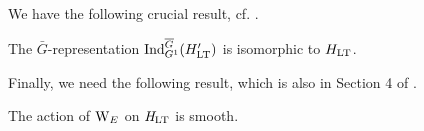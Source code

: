\documentclass[../main.tex]{subfiles}
\begin{document}
We have the following crucial result, cf. \cite[Section 4]{mieda2016geometric}.
\begin{prop}\label{lem:InductionStatementOnHLT}
  The $\bar G$-representation $\operatorname{Ind}_{G^1}^{\overline G} (H'_{\mathrm{LT}})$ is isomorphic to $H_{\mathrm{LT}}$. 
\end{prop}

Finally, we need the following result, which is also in Section 4 of
\cite{mieda2016geometric}.
\begin{lem}\label{lem:GActsSmoothlyOnHLT}
  The action of $\mathrm W_E$ on $\mathit H_{\mathrm{LT}}$ is smooth.
\end{lem}



\end{document}
